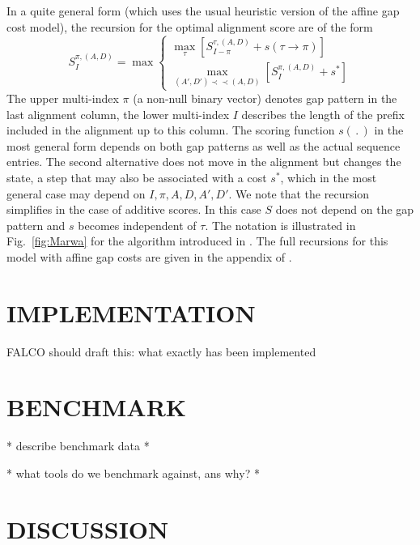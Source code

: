 \documentclass[a4paper,10pt]{article}
\newcommand{\TODO}[1]{\begingroup\color{red}#1\endgroup}
\newcommand{\pprec}{\mathrel{\prec\!\!\!\prec}}
\begin{document}
In a quite general form (which uses the usual heuristic version of the
affine gap cost model), the recursion for the optimal alignment score are
of the form
\begin{equation} 
  S^{\pi,(A,D)}_I = \max 
      \begin{cases}
        \displaystyle\max_{\tau} 
            \left[ S^{\tau,(A,D)}_{I-\pi} + s(\tau\to\pi)
                    \right]
        \\
        \displaystyle\max_{(A',D')\pprec(A,D)}  
                    \left[ S^{\pi,(A,D)}_I + s^*\right]
       \end{cases} 
\label{eq:maxrec}
\end{equation}
The upper multi-index $\pi$ (a non-null binary vector) denotes gap pattern
in the last alignment column, the lower multi-index $I$ describes the
length of the prefix included in the alignment up to this column. The
scoring function $s(\,.\,)$ in the most general form depends on both gap
patterns as well as the actual sequence entries. The second alternative
does not move in the alignment but changes the state, a step that may also
be associated with a cost $s^*$, which in the most general case may depend
on $I,\pi,A,D,A',D'$.  We note that the recursion simplifies in the case of
additive scores. In this case $S$ does not depend on the gap pattern and
$s$ becomes independent of $\tau$. The notation is illustrated in
Fig.~\ref{fig:Marwa} for the algorithm introduced in \cite{AlArab:17a}.
The full recursions for this model with affine gap costs are given in the
appendix of \cite{Retzlaff:18a}.


\section{\uppercase{Implementation}}

\TODO{FALCO should draft this: what exactly has been implemented} 


\section{\uppercase{Benchmark}}

\TODO{* describe benchmark data *}

\cite{oxbench}

\cite{balibase}

\TODO{* what tools do we benchmark against, ans why? *} 


\section{\uppercase{Discussion}}
\end{document}
